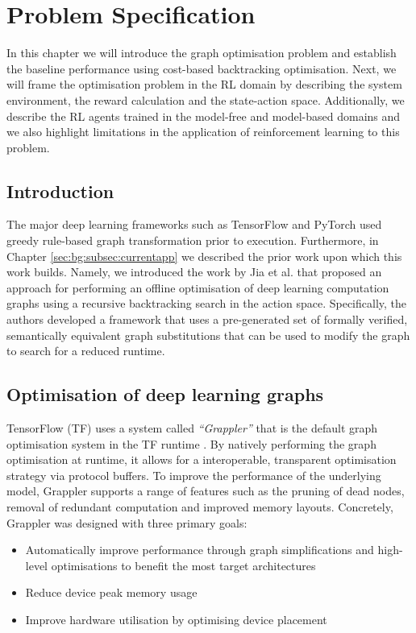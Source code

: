 \chapter{Problem Specification}

In this chapter we will introduce the graph optimisation problem and establish the baseline performance using cost-based backtracking optimisation. Next, we will frame the optimisation problem in the RL domain by describing the system environment, the reward calculation and the state-action space. Additionally, we describe the RL agents trained in the model-free and model-based domains and we also highlight limitations in the application of reinforcement learning to this problem.

\section{Introduction}
The major deep learning frameworks such as TensorFlow \cite{tensorflow2015-whitepaper} and PyTorch \cite{pytorch} used greedy rule-based graph transformation prior to execution. Furthermore, in Chapter \ref{sec:bg:subsec:currentapp} we described the prior work upon which this work builds. Namely, we introduced the work by Jia et al. \cite{jia2019taso,jia2019optimizing} that proposed an approach for performing an offline optimisation of deep learning computation graphs using a recursive backtracking search in the action space. Specifically, the authors developed a framework that uses a pre-generated set of formally verified, semantically equivalent graph substitutions that can be used to modify the graph to search for a reduced runtime.

\section{Optimisation of deep learning graphs}

TensorFlow (TF) uses a system called \textit{``Grappler''} that is the default graph optimisation system in the TF runtime \cite{larsen2019tensorflow}. By natively performing the graph optimisation at runtime, it allows for a interoperable, transparent optimisation strategy via protocol buffers. To improve the performance of the underlying model, Grappler supports a range of features such as the pruning of dead nodes, removal of redundant computation and improved memory layouts. Concretely, Grappler was designed with three primary goals:

\begin{itemize}
  \item Automatically improve performance through graph simplifications and high-level optimisations to benefit the most target architectures
  \item Reduce device peak memory usage
  \item Improve hardware utilisation by optimising device placement
\end{itemize}

